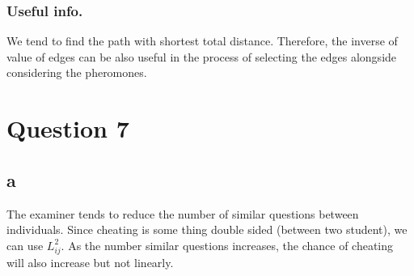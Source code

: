 \documentclass[]{article}
\begin{document}
	\subsubsection*{Useful info.}
	We tend to find the path with shortest total distance. Therefore, the inverse of value of edges can be also useful in the process of selecting the edges alongside considering the pheromones.
	
	\section{Question 7}
	\subsection*{a}
	The examiner tends to reduce the number of similar questions between individuals. Since cheating is some thing double sided (between two student), we can use $L_{ij}^2$. As the number similar questions increases, the chance of cheating will also increase but not linearly.
	
\end{document}
